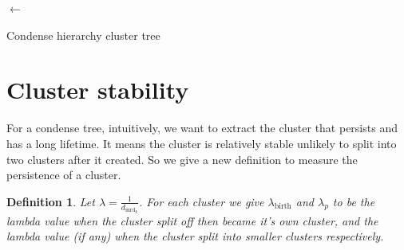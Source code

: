 \documentclass{article}
\newtheorem{definition}{Definition}
\begin{document}
	\begin{algorithm}[H]
		\SetAlgoNoLine
		\nodeList $\leftarrow$ \;
		\caption{Condense hierarchy cluster tree}
	\end{algorithm}
	
	
	\section{Cluster stability}
	
	For a condense tree, intuitively, we want to extract the cluster that persists and has a long lifetime. It means the cluster is relatively stable unlikely to split into two clusters after it created. So we give a new definition to measure the persistence of a cluster.
	
		\begin{definition}
			Let $\lambda = \frac{1}{d_{\mathrm{mrd}_k}}$. For each cluster we give $\lambda_{\mathrm{birth}}$ and $\lambda_p$ to be the lambda value when the cluster split off then became it’s own cluster, and the lambda value (if any) when the cluster split into smaller clusters respectively.
		\end{definition}
	
\end{document}

